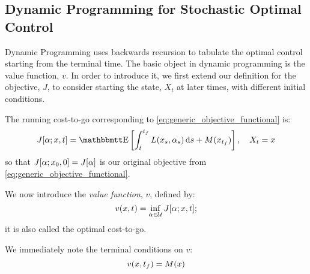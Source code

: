 \subsection{Dynamic Programming for Stochastic Optimal Control}
\label{sec:dynamic_programming}
Dynamic Programming uses backwards recursion to tabulate the optimal control
starting from the terminal time. The basic object in dynamic programming is the
value function, $v$. In order to introduce it, we first extend our definition
for the objective, $J$, to consider starting the state, $X_t$ at later
times, with different initial conditions.

The running cost-to-go corresponding to
\cref{eq:generic_objective_functional} is:
\begin{equation}
J[\a; x, t] = \Exp \left[ \int_t^\tf L(x_s, \a_s) \intd{s} + M(x_\tf) \right] ,
\quad X_t = x
\label{eq:generic_cost_to_go} 
\end{equation}
so that $J[\alpha; x_0, 0] = J[\alpha]$ is our original objective from
\cref{eq:generic_objective_functional}.
 
We now introduce the {\sl  value function}, $v$,
defined by: 
$$
v(x,t) = \inf_{\alpha \in { \mathcal{U} }} J[\alpha; x,t];  
$$
it is also called the optimal cost-to-go. 

We immediately note the terminal conditions on $v$:
\begin{equation}
v(x,{ t_f } ) = M(x)
\end{equation}

